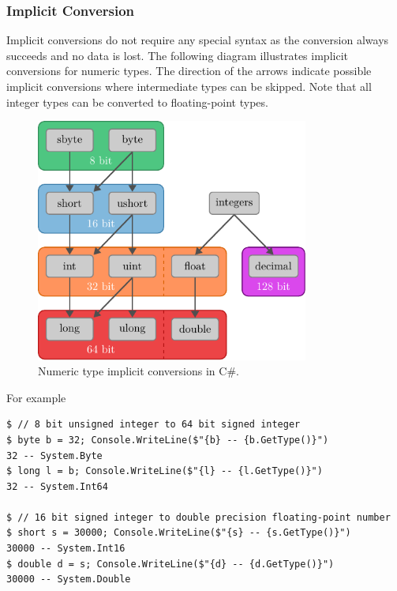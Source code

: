 \documentclass{article}
\begin{document}
\subsubsection{Implicit Conversion}
Implicit conversions do not require any special syntax as the conversion
always succeeds and no data is lost.
The following diagram illustrates implicit conversions for numeric types.
The direction of the arrows indicate possible implicit conversions where
intermediate types can be skipped.
Note that all integer types can be converted to floating-point types.
\begin{figure}[H]
    \centering
    \includegraphics[height = 8cm, keepaspectratio = true]{figures/implicit_conversions.pdf}
    \caption{Numeric type implicit conversions in C\#.}
\end{figure}
For example
\begin{lstlisting}
$ // 8 bit unsigned integer to 64 bit signed integer 
$ byte b = 32; Console.WriteLine($"{b} -- {b.GetType()}")
32 -- System.Byte
$ long l = b; Console.WriteLine($"{l} -- {l.GetType()}")
32 -- System.Int64

$ // 16 bit signed integer to double precision floating-point number
$ short s = 30000; Console.WriteLine($"{s} -- {s.GetType()}")
30000 -- System.Int16
$ double d = s; Console.WriteLine($"{d} -- {d.GetType()}")
30000 -- System.Double
\end{lstlisting}
\end{document}
